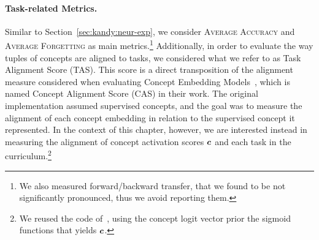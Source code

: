 

\paragraph{Task-related Metrics.} Similar to Section~\ref{sec:kandy:neur-exp}, we consider \textsc{\small Average Accuracy} and \textsc{\small Average Forgetting} as main metrics.\footnote{We also measured forward/backward transfer, that we found to be not significantly pronounced, thus we avoid reporting them.} Additionally, 
%
in order to evaluate the way tuples of concepts are aligned to tasks, we considered what we refer to as {\sc\small Task Alignment Score} ({\small\sc TAS}). This score is a direct transposition of the alignment measure considered when evaluating Concept Embedding Models~\cite{espinosa2022concept}, which is named {\sc\small Concept Alignment Score} ({\small\sc CAS}) in their work. The original implementation assumed supervised concepts, and the goal was to measure the alignment of each concept embedding in relation to the supervised concept it represented. In the context of this chapter, however, we are interested instead in measuring the alignment of concept activation scores ${\bm{c}}$ and each task in the curriculum.\footnote{We reused the code of~\cite{espinosa2022concept}, using the concept logit vector prior the sigmoid functions that yields ${\bm{c}}$.}
